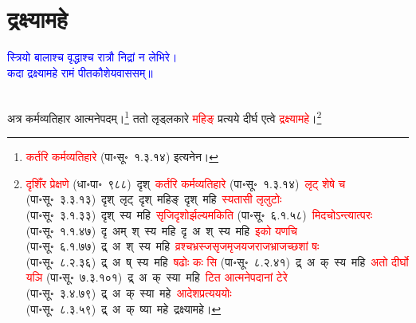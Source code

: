\section[द्रक्ष्यामहे]{द्रक्ष्यामहे}
\centering\textcolor{blue}{स्त्रियो बालाश्च वृद्धाश्च रात्रौ निद्रां न लेभिरे।\nopagebreak\\
कदा द्रक्ष्यामहे रामं पीतकौशेयवाससम्॥}\nopagebreak\\
\\
\fontsize{14}{21}\selectfont\begin{sloppypar}\justifying\noindent\hspace{10mm} अत्र कर्म\-व्यतिहार आत्मनेपदम्।\footnote{\textcolor{red}{कर्तरि कर्मव्यतिहारे} (पा॰सू॰~१.३.१४) इत्यनेन।} ततो लृड्लकारे \textcolor{red}{महिङ्} प्रत्यये दीर्घ एत्वे \textcolor{red}{द्रक्ष्यामहे}।\footnote{\textcolor{red}{दृशिँर प्रेक्षणे} (धा॰पा॰~९८८)~\arrow दृश्~\arrow \textcolor{red}{कर्तरि कर्मव्यतिहारे} (पा॰सू॰~१.३.१४)~\arrow \textcolor{red}{लृट् शेषे च} (पा॰सू॰~३.३.१३)~\arrow दृश्~लृट्~\arrow दृश्~महिङ्~\arrow दृश्~महि~\arrow \textcolor{red}{स्यतासी लृलुटोः} (पा॰सू॰~३.१.३३)~\arrow दृश्~स्य~महि~\arrow \textcolor{red}{सृजि\-दृशोर्झल्यमकिति} (पा॰सू॰~६.१.५८)~\arrow \textcolor{red}{मिदचोऽन्त्यात्परः} (पा॰सू॰~१.१.४७)~\arrow दृ~अम्~श्~स्य~महि~\arrow दृ~अ~श्~स्य~महि~\arrow \textcolor{red}{इको यणचि} (पा॰सू॰~६.१.७७)~\arrow द्र्~अ~श्~स्य~महि~\arrow \textcolor{red}{व्रश्चभ्रस्ज\-सृजमृज\-यजराज\-भ्राजच्छशां षः} (पा॰सू॰~८.२.३६)~\arrow द्र्~अ~ष्~स्य~महि~\arrow \textcolor{red}{षढोः कः सि} (पा॰सू॰~८.२.४१)~\arrow द्र्~अ~क्~स्य~महि~\arrow \textcolor{red}{अतो दीर्घो यञि} (पा॰सू॰~७.३.१०१)~\arrow द्र्~अ~क्~स्या~महि~\arrow \textcolor{red}{टित आत्मनेपदानां टेरे} (पा॰सू॰~३.४.७९)~\arrow द्र्~अ~क्~स्या~महे~\arrow \textcolor{red}{आदेश\-प्रत्यययोः} (पा॰सू॰~८.३.५९)~\arrow द्र्~अ~क्~ष्या~महे~\arrow द्रक्ष्यामहे।}\end{sloppypar}
